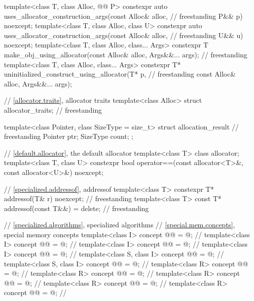 \begin{codeblock}
{  template<class T, class Alloc, @@ P>
    constexpr auto uses_allocator_construction_args(const Alloc& alloc,             // freestanding
                                                    P&& p) noexcept;
  template<class T, class Alloc, class U>
    constexpr auto uses_allocator_construction_args(const Alloc& alloc,             // freestanding
                                                    U&& u) noexcept;
  template<class T, class Alloc, class... Args>
    constexpr T make_obj_using_allocator(const Alloc& alloc, Args&&... args);       // freestanding
  template<class T, class Alloc, class... Args>
    constexpr T* uninitialized_construct_using_allocator(T* p,                      // freestanding
                                                         const Alloc& alloc, Args&&... args);

  // \ref{allocator.traits}, allocator traits
  template<class Alloc> struct allocator_traits;                                    // freestanding

  template<class Pointer, class SizeType = size_t>
  struct allocation_result {                                                        // freestanding
    Pointer ptr;
    SizeType count;
  };

  // \ref{default.allocator}, the default allocator
  template<class T> class allocator;
  template<class T, class U>
    constexpr bool operator==(const allocator<T>&, const allocator<U>&) noexcept;

  // \ref{specialized.addressof}, addressof
  template<class T>
    constexpr T* addressof(T& r) noexcept;                                          // freestanding
  template<class T>
    const T* addressof(const T&&) = delete;                                         // freestanding

  // \ref{specialized.algorithms}, specialized algorithms
  // \ref{special.mem.concepts}, special memory concepts
  template<class I>
    concept @@ = @\seebelow@;                // \expos
  template<class I>
    concept @@ = @\seebelow@;              // \expos
  template<class I>
    concept @@ = @\seebelow@;        // \expos
  template<class I>
    concept @@ = @\seebelow@;        // \expos
  template<class S, class I>
    concept @@ = @\seebelow@;                  // \expos
  template<class S, class I>
    concept @@ = @\seebelow@;            // \expos
  template<class R>
    concept @@ = @\seebelow@;                   // \expos
  template<class R>
    concept @@ = @\seebelow@;                 // \expos
  template<class R>
    concept @@ = @\seebelow@;           // \expos
  template<class R>
    concept @@ = @\seebelow@;           // \expos
  template<class R>
    concept @@ = @\seebelow@;     // \expos

}
\end{codeblock}
